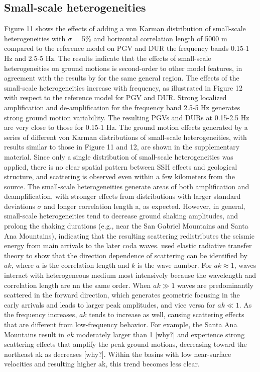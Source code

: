 \subsection{Small-scale heterogeneities}
Figure 11 shows the effects of adding a von Karman distribution of small-scale heterogeneities with $\sigma$ = 5\% and horizontal correlation length of 5000 m compared to the reference model on PGV and DUR the frequency bands 0.15-1 Hz and 2.5-5 Hz. The results indicate that the effects of small-scale heterogeneities on ground motions is second-order to other model features, in agreement with the results by \citet{savranGroundMotionSimulation2019} for the same general region. The effects of the small-scale heterogeneities increase with frequency, as illustrated in Figure 12 with respect to the reference model for PGV and DUR. Strong localized amplification and de-amplification for the frequency band 2.5-5 Hz generates strong ground motion variability. The resulting PGVs and DURs at 0.15-2.5 Hz are very close to those for 0.15-1 Hz. The ground motion effects generated by a series of different von Karman distributions of small-scale heterogeneities, with results similar to those in Figure 11 and 12,  are shown in the supplementary material.
Since only a single distribution of small-scale heterogeneities was applied, there is no clear spatial pattern between SSH effects and geological structure, and scattering is observed even within a few kilometers from the source. The small-scale heterogeneities generate areas of both amplification and deamplification, with stronger effects from distributions with larger standard deviations $\sigma$ and longer correlation length a, as expected. However, in general, small-scale heterogeneities tend to decrease ground shaking amplitudes, and prolong the shaking durations (e.g., near the San Gabriel Mountains and Santa Ana Mountains), indicating that the resulting scattering redistributes the seismic energy from main arrivals to the later coda waves.
\citet{przybillaEstimationCrustalScattering2009} used elastic radiative transfer theory to show  that the direction dependence of scattering can be identified by $ak$, where $a$ is the correlation length and $k$ is the wave number. For $ak \approx 1$, waves interact with heterogeneous medium most intensively because the wavelength and correlation length are nn the same order. When $ak\gg 1$ waves are predominantly scattered in the forward direction, which generates geometric focusing in the early arrivals and leads to larger peak amplitudes, and vice versa for $ak \ll 1$. As the frequency increases, $ak$ tends to increase as well, causing scattering effects that are different from low-frequency behavior. For example, the Santa Ana Mountains result in $ak$ moderately larger than 1 [why?] and experience strong scattering effects that amplify the peak ground motions, decreasing toward the northeast ak as decreases [why?]. Within the basins with low near-surface velocities and resulting higher ak, this trend becomes less clear.


